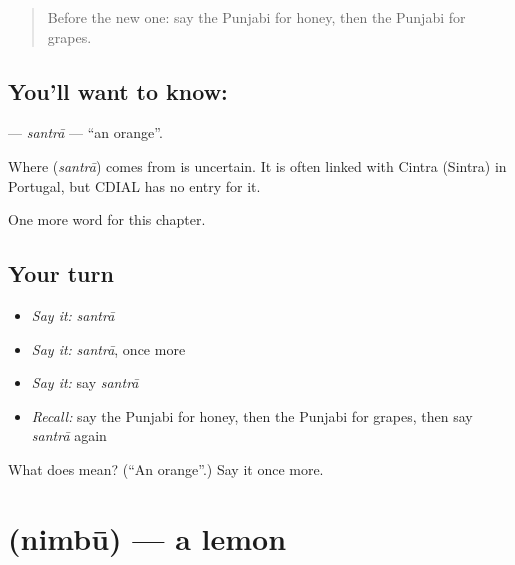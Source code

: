 \label{lesson:PA-C66-santra}



\begin{quote}
Before the new one: say the Punjabi for honey, then the Punjabi for grapes.
\end{quote}

\subsection*{You'll want to know: }
\textbf{} — \emph{santrā} — \textquotedblleft{}an orange\textquotedblright{}.

\begin{cousinweb}
Where \textbf{} (\emph{santrā}) comes from is uncertain. It is often linked with Cintra (Sintra) in Portugal, but CDIAL has no entry for it.
\end{cousinweb}

\begin{grammarlens}[title={What you've built}]
One more word for this chapter.
\end{grammarlens}

\subsection*{Your turn}
\begin{itemize}
\raggedright
  \item \emph{Say it:} \emph{santrā}
  \item \emph{Say it:} \emph{santrā}, once more
  \item \emph{Say it:} say \emph{santrā}
  \item \emph{Recall:} say the Punjabi for honey, then the Punjabi for grapes, then say \emph{santrā} again
\end{itemize}

\begin{tcolorbox}[breakable,colback=teal!4,colframe=teal!35!black,title={Before you move on}]
What does  mean? (\textquotedblleft{}An orange\textquotedblright{}.) Say it once more.
\end{tcolorbox}
\section[\texorpdfstring{\pa{ਨਿੰਬੂ} (nimbū)}{ਨਿੰਬੂ (nimbū)}]{ (nimbū) — a lemon}

\label{lesson:PA-C66-nimbu}



